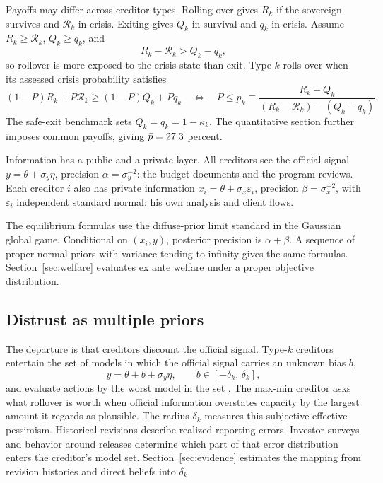 \documentclass[11pt]{article}
\theoremstyle{definition}
\begin{document}
Payoffs may differ across creditor types. Rolling over gives $R_k$ if the sovereign survives and $\mathcal R_k$ in crisis. Exiting gives $Q_k$ in survival and $q_k$ in crisis. Assume $R_k\geq\mathcal R_k$, $Q_k\geq q_k$, and
\begin{equation}
R_k-\mathcal R_k>Q_k-q_k,
\label{eq:relative-exposure}
\end{equation}
so rollover is more exposed to the crisis state than exit. Type $k$ rolls over when its assessed crisis probability satisfies
\begin{equation}
(1-P)R_k+P\mathcal R_k\geq(1-P)Q_k+Pq_k
\quad\Longleftrightarrow\quad
P\leq\bar p_k\equiv
\frac{R_k-Q_k}{(R_k-\mathcal R_k)-(Q_k-q_k)}.
\label{eq:pbar}
\end{equation}
The safe-exit benchmark sets $Q_k=q_k=1-\kappa_k$. The quantitative section further imposes common payoffs, giving $\bar p=27.3$ percent.

Information has a public and a private layer. All creditors see the official signal $y = \theta + \sigma_y \eta$, precision $\alpha = \sigma_y^{-2}$: the budget documents and the program reviews. Each creditor $i$ also has private information $x_i = \theta + \sigma_x \varepsilon_i$, precision $\beta = \sigma_x^{-2}$, with $\varepsilon_i$ independent standard normal: his own analysis and client flows.

The equilibrium formulas use the diffuse-prior limit standard in the Gaussian global game. Conditional on $(x_i,y)$, posterior precision is $\alpha+\beta$. A sequence of proper normal priors with variance tending to infinity gives the same formulas. Section~\ref{sec:welfare} evaluates ex ante welfare under a proper objective distribution.

\subsection{Distrust as multiple priors}

The departure is that creditors discount the official signal. Type-$k$ creditors entertain the set of models in which the official signal carries an unknown bias $b$,
\[
y = \theta + b + \sigma_y \eta, \qquad b \in [-\delta_k,\, \delta_k],
\]
and evaluate actions by the worst model in the set \citep{GilboaSchmeidler1989}. The max-min creditor asks what rollover is worth when official information overstates capacity by the largest amount it regards as plausible. The radius $\delta_k$ measures this subjective effective pessimism. Historical revisions describe realized reporting errors. Investor surveys and behavior around releases determine which part of that error distribution enters the creditor's model set. Section~\ref{sec:evidence} estimates the mapping from revision histories and direct beliefs into $\delta_k$.
\end{document}
